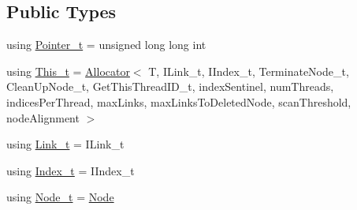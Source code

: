 \subsection*{Public Types}
\begin{DoxyCompactItemize}
\item 
using \mbox{\hyperlink{class_n_u_c_a_r_lock_free_d_s_1_1_allocator_a3931e84d06ddd3b436103475197eb12a}{Pointer\+\_\+t}} = unsigned long long int
\item 
using \mbox{\hyperlink{class_n_u_c_a_r_lock_free_d_s_1_1_allocator_aa7636b4884545094b9532cc295604b17}{This\+\_\+t}} = \mbox{\hyperlink{class_n_u_c_a_r_lock_free_d_s_1_1_allocator}{Allocator}}$<$ T, I\+Link\+\_\+t, I\+Index\+\_\+t, Terminate\+Node\+\_\+t, Clean\+Up\+Node\+\_\+t, Get\+This\+Thread\+I\+D\+\_\+t, index\+Sentinel, num\+Threads, indices\+Per\+Thread, max\+Links, max\+Links\+To\+Deleted\+Node, scan\+Threshold, node\+Alignment $>$
\item 
using \mbox{\hyperlink{class_n_u_c_a_r_lock_free_d_s_1_1_allocator_a5508d82b795e6c1977bebb67b5e5b686}{Link\+\_\+t}} = I\+Link\+\_\+t
\item 
using \mbox{\hyperlink{class_n_u_c_a_r_lock_free_d_s_1_1_allocator_a2776cca35e8343bf5007bd8b6f3a3f8f}{Index\+\_\+t}} = I\+Index\+\_\+t
\item 
using \mbox{\hyperlink{class_n_u_c_a_r_lock_free_d_s_1_1_allocator_ac44b7846713e20e26a7eede2492fda47}{Node\+\_\+t}} = \mbox{\hyperlink{class_n_u_c_a_r_lock_free_d_s_1_1_allocator_1_1_node}{Node}}
\end{DoxyCompactItemize}
